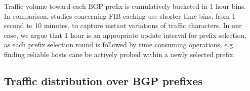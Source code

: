 Traffic volume toward each BGP prefix is cumulatively bucketed in 1 hour bins.
In comparison, studies concerning FIB caching \cite{Sarrar2012, Zhang2012} use shorter time bins, from 1 second to 10 minutes, to capture instant variations of traffic characters.
In our case, we argue that 1 hour is an appropriate update interval for 
prefix selection, as each prefix selection round is followed by time consuming operations, e.g. finding reliable hosts cane be actively probed within a newly selected prefix. 

\subsection{Traffic distribution over BGP prefixes}
\label{sec:dis}

